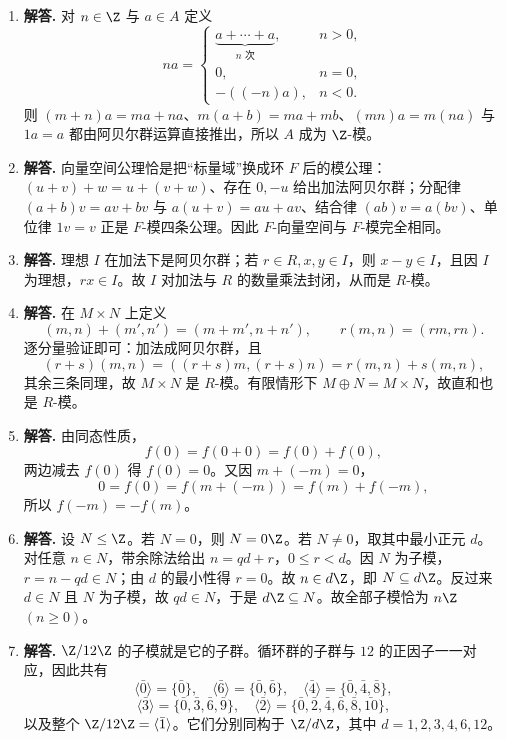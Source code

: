 \begin{enumerate}[label=\textbf{\arabic*.}, leftmargin=*, itemsep=1em]
  \item \textbf{解答.} 对 $n\in\Z$ 与 $a\in A$ 定义
  \[
  na=\begin{cases}
  \underbrace{a+\cdots+a}_{n\text{ 次}},&n>0,\\
  0,&n=0,\\
  -((-n)a),&n<0.
  \end{cases}
  \]
  则 $(m+n)a=ma+na$、$m(a+b)=ma+mb$、$(mn)a=m(na)$ 与 $1a=a$ 都由阿贝尔群运算直接推出，所以 $A$ 成为 $\Z$-模。

  \item \textbf{解答.} 向量空间公理恰是把“标量域”换成环 $F$ 后的模公理：$(u+v)+w=u+(v+w)$、存在 $0,-u$ 给出加法阿贝尔群；分配律 $(a+b)v=av+bv$ 与 $a(u+v)=au+av$、结合律 $(ab)v=a(bv)$、单位律 $1v=v$ 正是 $F$-模四条公理。因此 $F$-向量空间与 $F$-模完全相同。

  \item \textbf{解答.} 理想 $I$ 在加法下是阿贝尔群；若 $r\in R,x,y\in I$，则 $x-y\in I$，且因 $I$ 为理想，$rx\in I$。故 $I$ 对加法与 $R$ 的数量乘法封闭，从而是 $R$-模。

  \item \textbf{解答.} 在 $M\times N$ 上定义
  \[
  (m,n)+(m',n')=(m+m',n+n'),\qquad r(m,n)=(rm,rn).
  \]
  逐分量验证即可：加法成阿贝尔群，且
  \[
  (r+s)(m,n)=((r+s)m,(r+s)n)=r(m,n)+s(m,n),
  \]
  其余三条同理，故 $M\times N$ 是 $R$-模。有限情形下 $M\oplus N=M\times N$，故直和也是 $R$-模。

  \item \textbf{解答.} 由同态性质，
  \[
  f(0)=f(0+0)=f(0)+f(0),
  \]
  两边减去 $f(0)$ 得 $f(0)=0$。又因 $m+(-m)=0$，
  \[
  0=f(0)=f(m+(-m))=f(m)+f(-m),
  \]
  所以 $f(-m)=-f(m)$。

  \item \textbf{解答.} 设 $N\le \Z$。若 $N=0$，则 $N=0\Z$。若 $N\neq 0$，取其中最小正元 $d$。对任意 $n\in N$，带余除法给出 $n=qd+r$，$0\le r<d$。因 $N$ 为子模，$r=n-qd\in N$；由 $d$ 的最小性得 $r=0$。故 $n\in d\Z$，即 $N\subseteq d\Z$。反过来 $d\in N$ 且 $N$ 为子模，故 $qd\in N$，于是 $d\Z\subseteq N$。故全部子模恰为 $n\Z$ $(n\ge 0)$。

  \item \textbf{解答.} $\Z/12\Z$ 的子模就是它的子群。循环群的子群与 $12$ 的正因子一一对应，因此共有
  \[
  \langle \bar 0\rangle=\{\bar 0\},\quad \langle \bar 6\rangle=\{\bar 0,\bar 6\},\quad \langle \bar 4\rangle=\{\bar 0,\bar 4,\bar 8\},
  \]
  \[
  \langle \bar 3\rangle=\{\bar 0,\bar 3,\bar 6,\bar 9\},\quad \langle \bar 2\rangle=\{\bar 0,\bar 2,\bar 4,\bar 6,\bar 8,\bar{10}\},
  \]
  以及整个 $\Z/12\Z=\langle \bar 1\rangle$。它们分别同构于 $\Z/d\Z$，其中 $d=1,2,3,4,6,12$。


\end{enumerate}
